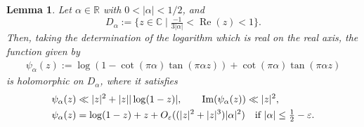 \documentclass[11pt]{amsart}
\newcommand{\eps}{\varepsilon}
\newcommand{\R}{\mathbb{R}}
\newcommand{\C}{\mathbb{C}}
\newtheorem{lemma}{Lemma}
\theoremstyle{definition}
\renewcommand\Re{\operatorname{Re}}
\renewcommand\Im{\operatorname{Im}}
\newcommand{\1}{{\mathbf 1}}
\newcommand{\abs}[1]{\left|#1\right|}
\let\originalleft\left
\let\originalright\right
\renewcommand{\left}{\mathopen{}\mathclose\bgroup\originalleft}
\renewcommand{\right}{\aftergroup\egroup\originalright}
\numberwithin{equation}{section}
\begin{document}
\begin{lemma}\label{mlftt}
  Let $\alpha\in\R$ with $0<|\alpha|<1/2$, and
  $$ D_\alpha := \{z\in\C \mid \tfrac{-1}{{3}|\alpha|} < \Re(z)<1\}. $$
  Then, taking the determination of the logarithm which is real on the real axis, the function given by
  \begin{align}\label{dfps}
    \psi_\alpha(z):=\log(1-\cot(\pi \alpha)\tan(\pi \alpha z))+\cot(\pi \alpha)\tan(\pi \alpha z)
  \end{align}
  is holomorphic on $D_\alpha$, where it satisfies
  \begin{align}
    &\psi_\alpha(z)\ll |z|^2+|z||\log(1-z)|, \qquad \Im(\psi_\alpha(z))\ll |z|^2,\label{dfps1}\\
    &\psi_\alpha(z)=\log(1-z)+z+O_\eps((|z|^2+|z|^3)|\alpha|^2) \quad \text{if $\abs{\alpha}\leq\tfrac{1}{2}-\eps$.}\label{dfps2}
  \end{align}
\end{lemma}
\end{document}
